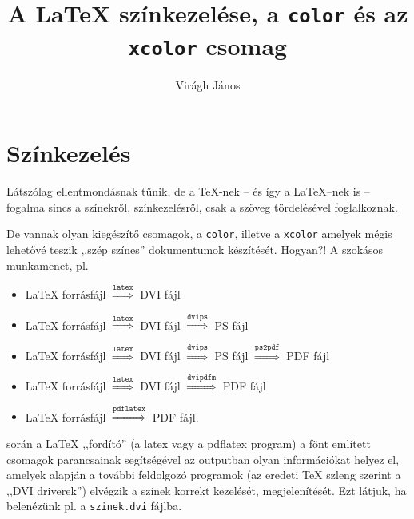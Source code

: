 \documentclass{article}
\title{A \LaTeX{} színkezelése, a \texttt{color} és az \texttt{xcolor} csomag}
\author{Virágh János}
\begin{document}
	\maketitle
	\tableofcontents
\section{Színkezelés}
Látszólag ellentmondásnak tűnik, de a \TeX{}-nek -- és így a \LaTeX{}--nek is -- fogalma sincs a színekről, színkezelésről, csak a szöveg tördelésével foglalkoznak.

De vannak olyan kiegészítő csomagok, a  \verb!color!, illetve a  \verb!xcolor! amelyek mégis lehetővé teszik ,,szép  színes'' dokumentumok készítését. Hogyan?!
A szokásos munkamenet, pl.
\begin{itemize}
	\item \LaTeX{} forrásfájl \ensuremath{\stackrel{\texttt{latex}}{\Longrightarrow}} DVI fájl
	\item \LaTeX{} forrásfájl \ensuremath{\stackrel{\texttt{latex}}{\Longrightarrow}} DVI fájl %
	\ensuremath{\stackrel{\texttt{dvips}}{\Longrightarrow}} PS fájl
	\item \LaTeX{} forrásfájl \ensuremath{\stackrel{\texttt{latex}}{\Longrightarrow}} DVI fájl %
	\ensuremath{\stackrel{\texttt{dvips}}{\Longrightarrow}} PS fájl \ensuremath{\stackrel{\texttt{ps2pdf}}{\Longrightarrow}} PDF fájl
	\item \LaTeX{} forrásfájl \ensuremath{\stackrel{\texttt{latex}}{\Longrightarrow}} DVI fájl%
	\ensuremath{\stackrel{\texttt{dvipdfm}}{\Longrightarrow}} PDF fájl
	\item \LaTeX{} forrásfájl \ensuremath{\stackrel{\texttt{pdflatex}}{\Longrightarrow}} PDF fájl.
\end{itemize}
során a \LaTeX{} ,,fordító'' (a latex vagy a pdflatex program) a fönt említett csomagok parancsainak segítségével az outputban olyan információkat helyez el, amelyek alapján a további feldolgozó programok (az eredeti \TeX{} szleng szerint a ,,DVI driverek'') elvégzik a színek korrekt kezelését, megjelenítését. Ezt látjuk, ha belenézünk pl. a \texttt{szinek.dvi} fájlba.
\pagebreak[4]
\end{document}
